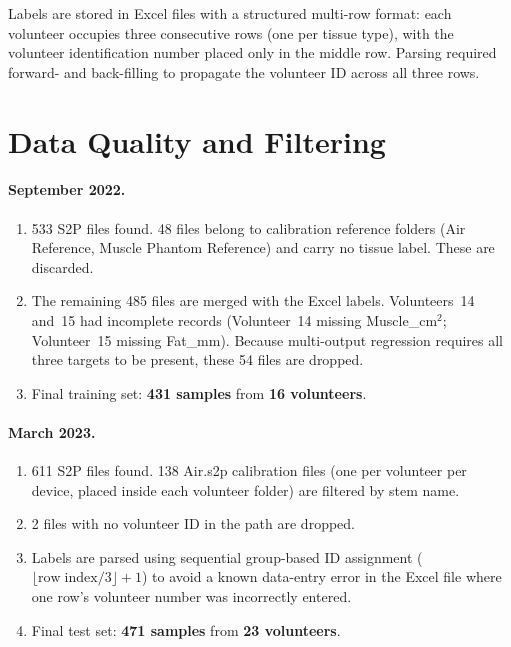 \documentclass[12pt, a4paper, oneside]{report}
\begin{document}
Labels are stored in Excel files with a structured multi-row format: each volunteer occupies three consecutive rows (one per tissue type), with the volunteer identification number placed only in the middle row. Parsing required forward- and back-filling to propagate the volunteer ID across all three rows.

\section{Data Quality and Filtering}
\label{sec:quality}

\paragraph{September 2022.}
\begin{enumerate}[noitemsep]
  \item 533 S2P files found. 48 files belong to calibration reference folders (Air Reference, Muscle Phantom Reference) and carry no tissue label. These are discarded.
  \item The remaining 485 files are merged with the Excel labels. Volunteers~14 and~15 had incomplete records (Volunteer~14 missing Muscle\_cm$^2$; Volunteer~15 missing Fat\_mm). Because multi-output regression requires all three targets to be present, these 54 files are dropped.
  \item Final training set: \textbf{431 samples} from \textbf{16 volunteers}.
\end{enumerate}

\paragraph{March 2023.}
\begin{enumerate}[noitemsep]
  \item 611 S2P files found. 138 Air.s2p calibration files (one per volunteer per device, placed inside each volunteer folder) are filtered by stem name.
  \item 2 files with no volunteer ID in the path are dropped.
  \item Labels are parsed using sequential group-based ID assignment ($\lfloor \mathrm{row\;index} / 3 \rfloor + 1$) to avoid a known data-entry error in the Excel file where one row's volunteer number was incorrectly entered.
  \item Final test set: \textbf{471 samples} from \textbf{23 volunteers}.
\end{enumerate}
\end{document}
